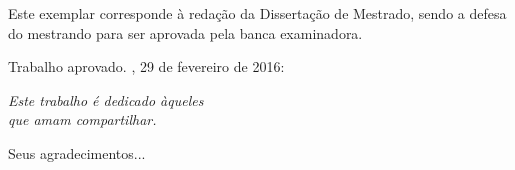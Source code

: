 \documentclass[
	12pt,				%
	oneside,			%
	a4paper,			%
	english,			%
	brazil				%
	]{abntex2}
\newcommand{\includepaper}[1]{}
\renewcommand{\ABNTEXchapterfont}{\rmfamily\bfseries}
\begin{document}
%
%
\begin{folhadeaprovacao}
  \begin{center}
    \begin{center}
      \ABNTEXchapterfont\bfseries\LARGE\imprimirtitulo
    \end{center}

    \vfill
    \hfill
    \begin{minipage}{.51\textwidth}
      Este exemplar corresponde à redação da Dissertação de Mestrado, sendo a
      defesa do mestrando \textbf{\imprimirautor} para ser aprovada pela banca
      examinadora.
    \end{minipage}%
  \end{center}

  \vfill
  \begin{center}
    Trabalho aprovado. \imprimirlocal, 29 de fevereiro de 2016:
  \end{center}

   \setlength{\ABNTEXsignwidth}{9cm}
   \assinatura{\textbf{\imprimirorientador}\\Orientador}

   \vfill
   \vfill

\end{folhadeaprovacao}

\begin{dedicatoria}
   \vspace*{\fill}
   \centering
   \noindent
   \textit{Este trabalho é dedicado àqueles\\
           que amam compartilhar.} \vspace*{\fill}

\end{dedicatoria}

\begin{agradecimentos}
Seus agradecimentos...
\end{agradecimentos}

\end{document}
